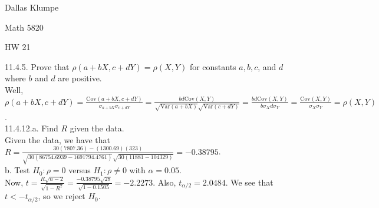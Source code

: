 \documentclass[12pt]{article}
\begin{document}
\noindent Dallas Klumpe

\noindent Math 5820

\noindent HW 21

11.4.5. Prove that $\rho(a+bX,c+dY)=\rho(X,Y)$ for constants $a, b, c$, and $d$ where $b$ and $d$ are positive.\\
Well, $\rho(a+bX,c+dY)=\frac{\text{Cov}(a+bX,c+dY)}{\sigma_{a+bX}\sigma_{c+dY}}=\frac{bd\text{Cov}(X,Y)}{\sqrt{\text{Var}(a+bX)}\sqrt{\text{Var}(c+dY)}}=\frac{bd\text{Cov}(X,Y)}{b\sigma_Xd\sigma_Y}=\frac{\text{Cov}(X,Y)}{\sigma_X\sigma_Y}=\rho(X,Y)$.\\[20pt]

11.4.12.a. Find $R$ given the data.\\
Given the data, we have that $R=\frac{30(7807.36)-(1300.69)(323)}{\sqrt{30(86754.6939-1691794.4761)}\sqrt{30(11881-104329)}}=-0.38795$.\\
b. Test $H_0:\rho=0$ versus $H_1:\rho\neq0$ with $\alpha=0.05$.\\
Now, $t=\frac{R\sqrt{n-2}}{\sqrt{1-R^2}}=\frac{-0.38795\sqrt{28}}{\sqrt{1-0.1505}}=-2.2273$. Also, $t_{\alpha/2}=2.0484$. We see that $t<-t_{\alpha/2}$, so we reject $H_0$.
\end{document}
